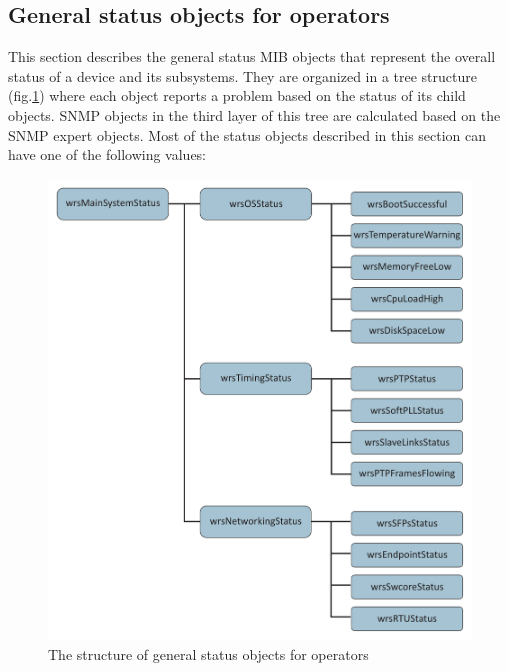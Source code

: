\subsection{General status objects for operators}
\label{sec:snmp_exports:basic}
This section describes the general status MIB objects that represent the overall
status of a device and its subsystems. They are organized in a tree structure
(fig.\ref{fig:snmp_oper}) where each object reports a problem based on the
status of its child objects. SNMP objects in the third layer of this tree are
calculated based on the SNMP expert objects. Most of the status objects
described in this section can have one of the following values:
\begin{figure}[ht]
  \begin{center}
    \includegraphics[width=.8\textwidth]{img/snmp_obj.pdf}
    \caption{The structure of general status objects for operators}
    \label{fig:snmp_oper}
  \end{center}
\end{figure}
